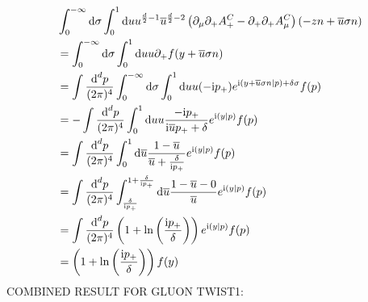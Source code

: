 \begin{align}
	&\int_{0}^{-\infty} \text{d} \sigma \int_0^1 \text{d} u u^{\frac{d}{2}-1} \overline u^{\frac{d}{2}-2} \left(\partial_\mu \partial_+ A^C_+ - \partial_+\partial_+ A^C_\mu\right)(-zn+\overline u \sigma n)
	\\
	&=
	\int_{0}^{-\infty} \text{d} \sigma \int_0^1 \text{d} u u \partial_+ f(y+\overline u \sigma n)
	\\
	&=
	\int \frac{\text{d} ^d p}{(2\pi)^4}\int_{0}^{-\infty} \text{d} \sigma \int_0^1 \text{d} u u (-\text{i}p_{+}) e^{\text{i} (y+\overline u \sigma n|p)+\delta \sigma} f(p)
	\\
	&=
	-\int \frac{\text{d} ^d p}{(2\pi)^4} \int_0^1 \text{d} u u \frac{-\text{i}p_{+}}{\text{i} \overline u p_{+} + \delta} e^{\text{i} (y|p)} f(p)
	\\
	&=
	\int \frac{\text{d} ^d p}{(2\pi)^4}\int_0^1 \text{d} \overline u \frac{1-\overline u}{ \overline u + \frac{\delta}{\text{i}p_{+}}} e^{\text{i} (y|p)} f(p)
	\\
	&=
	\int \frac{\text{d} ^d p}{(2\pi)^4}\int_{\frac{\delta}{\text{i}p_{+}}}^{1+\frac{\delta}{\text{i}p_{+}}} \text{d} \overline u \frac{1-\overline u-0}{ \overline u } e^{\text{i} (y|p)} f(p)
	\\
	&=
	\int \frac{\text{d} ^d p}{(2\pi)^4}\left(1+\ln\left(\frac{\text{i}p_{+}}{\delta}\right)\right) e^{\text{i} (y|p)} f(p)
	\\
	&=
	\left(1+\ln\left(\frac{\text{i}p_{+}}{\delta}\right)\right) f(y)
\end{align}
COMBINED RESULT FOR GLUON TWIST1: 
\ifdefined\mainprogram{}
\else

\fi